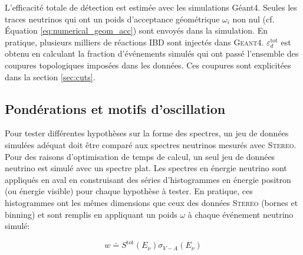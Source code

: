 \bigbreak

L'efficacité totale de détection est estimée avec les simulations Géant4. Seules les traces neutrinos qui ont un poids d'acceptance géométrique $\omega_i$ non nul  (cf. Équation \ref{eq:numerical_geom_acc}) sont envoyés dans la simulation. En pratique, plusieurs milliers de réactions IBD sont injectés dans \textsc{Geant4}. $\varepsilon_d^{\textrm{tot}}$ est obtenu en calculant la fraction d'événements simulés qui ont passé l'ensemble des coupures topologiques imposées dans les données. Ces coupures sont explicitées dans la section \ref{sec:cuts}.

\bigbreak

\subsection{Pondérations et motifs d'oscillation}
\label{sec:building_oscillation}

Pour tester différentes hypothèses sur la forme des spectres, un jeu de données simulées adéquat doit être comparé aux spectres neutrinos mesurés avec \textsc{Stereo}. Pour des raisons d'optimisation de temps de calcul, un seul jeu de données neutrino est simulé avec un spectre plat. Les spectres en énergie neutrino sont appliqués en aval en construisant des séries d'histogrammes en énergie positron (ou énergie visible) pour chaque hypothèse à tester. En pratique, ces histogrammes ont les mêmes dimensions que ceux des données \textsc{Stereo} (bornes et binning) et sont remplis en appliquant un poids $\omega$ à chaque événement neutrino simulé:

\begin{equation}
    w \doteq S^\textrm{tot}(E_\nu) \sigma_{V-A}(E_\nu)
\end{equation}

\bigbreak

